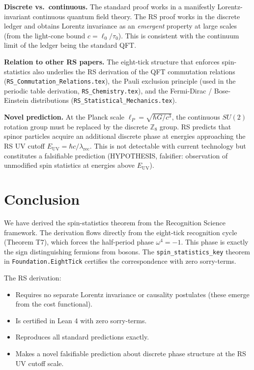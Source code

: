 \documentclass[12pt,a4paper]{article}
\theoremstyle{definition}
\theoremstyle{remark}
\begin{document}
\textbf{Discrete vs.\ continuous.}  The standard proof works in a
manifestly Lorentz-invariant continuous quantum field theory.  The RS
proof works in the discrete ledger and obtains Lorentz invariance as an
\emph{emergent} property at large scales (from the light-cone bound $c =
\ell_0/\tau_0$).  This is consistent with the continuum limit of the
ledger being the standard QFT.

\textbf{Relation to other RS papers.}
The eight-tick structure that enforces spin-statistics also underlies
the RS derivation of the QFT commutation relations
(\texttt{RS\_Commutation\_Relations.tex}), the Pauli exclusion principle
(used in the periodic table derivation, \texttt{RS\_Chemistry.tex}),
and the Fermi-Dirac / Bose-Einstein distributions
(\texttt{RS\_Statistical\_Mechanics.tex}).

\textbf{Novel prediction.}  At the Planck scale $\ell_P = \sqrt{\hbar G/c^3}$,
the continuous $SU(2)$ rotation group must be replaced by the discrete
$\mathbb{Z}_8$ group.  RS predicts that spinor particles acquire an
additional discrete phase at energies approaching the RS UV cutoff
$E_\mathrm{UV} = \hbar c/\lambda_\mathrm{rec}$.  This is not detectable
with current technology but constitutes a falsifiable prediction
(HYPOTHESIS, falsifier: observation of unmodified spin statistics at
energies above $E_\mathrm{UV}$).

\section{Conclusion}
\label{sec:conclusion}

We have derived the spin-statistics theorem from the Recognition Science
framework.  The derivation flows directly from the eight-tick recognition
cycle (Theorem T7), which forces the half-period phase $\omega^4 = -1$.
This phase is exactly the sign distinguishing fermions from bosons.  The
\texttt{spin\_statistics\_key} theorem in \texttt{Foundation.EightTick}
certifies the correspondence with zero sorry-terms.

The RS derivation:
\begin{itemize}
  \item Requires no separate Lorentz invariance or causality postulates
        (these emerge from the cost functional).
  \item Is certified in Lean 4 with zero sorry-terms.
  \item Reproduces all standard predictions exactly.
  \item Makes a novel falsifiable prediction about discrete phase
        structure at the RS UV cutoff scale.
\end{itemize}
\end{document}
